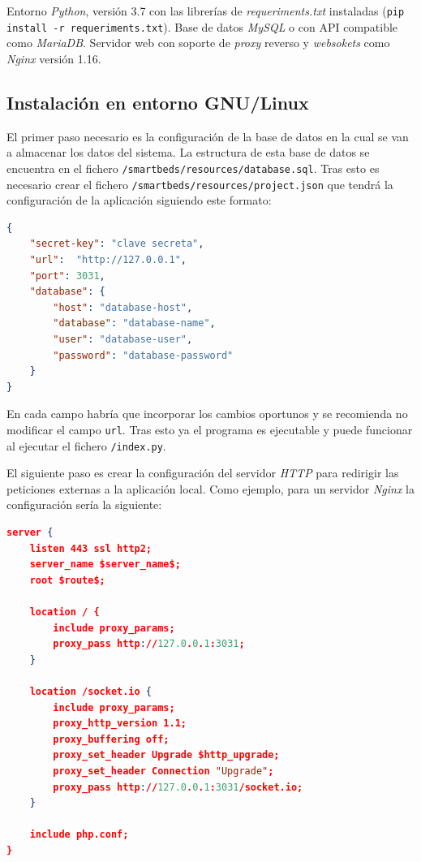 Entorno \textit{Python}, versión 3.7 con las librerías de \textit{requeriments.txt} instaladas (\texttt{pip install -r requeriments.txt}).
Base de datos \textit{MySQL} o con API compatible como \textit{MariaDB}. Servidor web con soporte de \textit{proxy} reverso y \textit{websokets} como \textit{Nginx} versión 1.16.

\subsection{Instalación en entorno GNU/Linux}

El primer paso necesario es la configuración de la base de datos en la cual se van a almacenar los datos del sistema. La estructura de esta base de datos se encuentra en el fichero \texttt{/smartbeds/resources/database.sql}. Tras esto es necesario crear el fichero \texttt{/smartbeds/resources/project.json} que tendrá la configuración de la aplicación siguiendo este formato:

\begin{lstlisting}[language=JSON]
{
	"secret-key": "clave secreta",
	"url":  "http://127.0.0.1",
	"port": 3031,
	"database": {
		"host": "database-host",
		"database": "database-name",
		"user": "database-user",
		"password": "database-password"
	}
}
\end{lstlisting}

En cada campo habría que incorporar los cambios oportunos y se recomienda no modificar el campo \texttt{url}. Tras esto ya el programa es ejecutable y puede funcionar al ejecutar el fichero \texttt{/index.py}.

El siguiente paso es crear la configuración del servidor \textit{HTTP} para redirigir las peticiones externas a la aplicación local. Como ejemplo, para un servidor \textit{Nginx} la configuración sería la siguiente:

\begin{lstlisting}[language=JSON]
server {
	listen 443 ssl http2;
	server_name $server_name$;
	root $route$;
	
	location / {
		include proxy_params;
		proxy_pass http://127.0.0.1:3031;
	}
	
	location /socket.io {
		include proxy_params;
		proxy_http_version 1.1;
		proxy_buffering off;
		proxy_set_header Upgrade $http_upgrade;
		proxy_set_header Connection "Upgrade";
		proxy_pass http://127.0.0.1:3031/socket.io;
	}
	
	include php.conf;
}
\end{lstlisting}

